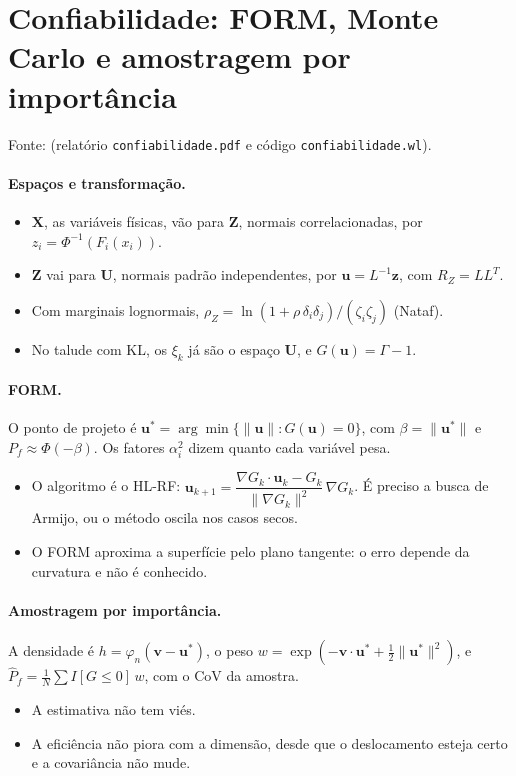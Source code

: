 \section{Confiabilidade: FORM, Monte Carlo e amostragem por importância}
\label{sec:confiab}

Fonte:  (relatório \texttt{confiabilidade.pdf} e código \texttt{confiabilidade.wl}).

\paragraph{Espaços e transformação.}
\begin{itemize}
  \item $\bm X$, as variáveis físicas, vão para $\bm Z$, normais correlacionadas, por $z_i = \Phi^{-1}(F_i(x_i))$.
  \item $\bm Z$ vai para $\bm U$, normais padrão independentes, por $\bm u = L^{-1}\bm z$, com $R_Z = LL^T$.
  \item Com marginais lognormais, $\rho_Z = \ln(1 + \rho\,\delta_i\delta_j)/(\zeta_i\zeta_j)$ (Nataf).
  \item No talude com KL, os $\xi_k$ já são o espaço $\bm U$, e $G(\bm u) = \Gamma - 1$.
\end{itemize}

\paragraph{FORM.} O ponto de projeto é $\bm u^* = \arg\min\{\|\bm u\| : G(\bm u) = 0\}$, com $\beta = \|\bm u^*\|$ e
$P_f \approx \Phi(-\beta)$. Os fatores $\alpha_i^2$ dizem quanto cada variável pesa.
\begin{itemize}
  \item O algoritmo é o HL-RF:
    $\bm u_{k+1} = \dfrac{\nabla G_k\cdot\bm u_k - G_k}{\|\nabla G_k\|^2}\,\nabla G_k$. É preciso a busca de Armijo, ou o
    método oscila nos casos secos.
  \item O FORM aproxima a superfície pelo plano tangente: o erro depende da curvatura e não é conhecido.
\end{itemize}

\paragraph{Amostragem por importância.} A densidade é $h = \varphi_n(\bm v - \bm u^*)$, o peso
$w = \exp(-\bm v\cdot\bm u^* + \tfrac12\|\bm u^*\|^2)$, e $\hat P_f = \frac1N\sum I[G \leq 0]\,w$, com o CoV da amostra.
\begin{itemize}
  \item A estimativa não tem viés.
  \item A eficiência não piora com a dimensão, desde que o deslocamento esteja certo e a covariância não mude.
\end{itemize}

